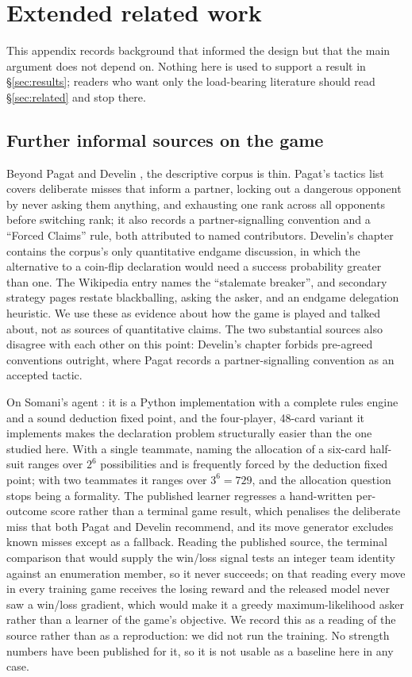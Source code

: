 \section{Extended related work}
\label{app:related}

This appendix records background that informed the design but that the main
argument does not depend on. Nothing here is used to support a result in
\S\ref{sec:results}; readers who want only the load-bearing literature should
read \S\ref{sec:related} and stop there.

\subsection{Further informal sources on the game}

Beyond Pagat \cite{pagat} and Develin \cite{develin}, the descriptive corpus
is thin. Pagat's tactics list covers deliberate misses that inform a partner,
locking out a dangerous opponent by never asking them anything, and exhausting
one rank across all opponents before switching rank; it also records a
partner-signalling convention and a ``Forced Claims'' rule, both attributed to
named contributors. Develin's chapter contains the corpus's only quantitative
endgame discussion, in which the alternative to a coin-flip declaration would
need a success probability greater than one. The Wikipedia entry
\cite{wikiliterature} names the ``stalemate breaker'', and secondary strategy
pages \cite{dorsa,strategy-site} restate blackballing, asking the asker, and
an endgame delegation heuristic. We use these as evidence about how the game
is played and talked about, not as sources of quantitative claims. The two
substantial sources also disagree with each other on this point: Develin's
chapter forbids pre-agreed conventions outright, where Pagat records a
partner-signalling convention as an accepted tactic.

On Somani's agent \cite{somani,somani-server}: it is a Python implementation
with a complete rules engine and a sound deduction fixed point, and the
four-player, 48-card variant it implements makes the declaration problem
structurally easier than the one studied here. With a single teammate, naming
the allocation of a six-card half-suit ranges over $2^6$ possibilities and is
frequently forced by the deduction fixed point; with two teammates it ranges
over $3^6 = 729$, and the allocation question stops being a formality. The
published learner regresses a hand-written per-outcome score rather than a
terminal game result, which penalises the deliberate miss that both Pagat and
Develin recommend, and its move generator excludes known misses except as a
fallback. Reading the published source, the terminal comparison that would
supply the win/loss signal tests an integer team identity against an enumeration
member, so it never succeeds; on that reading every move in every training game
receives the losing reward and the released model never saw a win/loss gradient,
which would make it a greedy maximum-likelihood asker rather than a learner of
the game's objective. We record this as a reading of the source rather than as a
reproduction: we did not run the training. No strength numbers have been
published for it, so it is not usable as a baseline here in any case.

